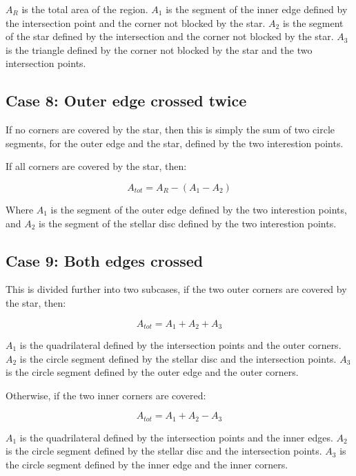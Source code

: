 \documentclass[a4paper,fleqn,usenatbib]{mnras}
\begin{document}
$A_R$ is the total area of the region. $A_1$ is the segment of the inner edge defined by the intersection point and the corner not blocked by the star. $A_2$ is the segment of the star defined by the intersection and the corner not blocked by the star. $A_3$ is the triangle defined by the corner not blocked by the star and the two intersection points.

\subsection*{Case 8: Outer edge crossed twice}

If no corners are covered by the star, then this is simply the sum of two circle segments, for the outer edge and the star, defined by the two interestion points.

If all corners are covered by the star, then:

\begin{equation} \label{eq:inner_outer}
A_{tot} = A_R - (A_1 - A_2)
\end{equation}

Where $A_1$ is the segment of the outer edge defined by the two interestion points, and $A_2$ is the segment of the stellar disc defined by the two interestion points. 

\subsection*{Case 9: Both edges crossed}

This is divided further into two subcases, if the two outer corners are covered by the star, then:

\begin{equation} \label{eq:inner_outer}
A_{tot} = A_1 + A_2 + A_3
\end{equation}

$A_1$ is the quadrilateral defined by the intersection points and the outer corners. $A_2$ is the circle segment defined by the stellar disc and the intersection points. $A_3$ is the circle segment defined by the outer edge and the outer corners.

Otherwise, if the two inner corners are covered:

\begin{equation} \label{eq:inner_outer}
A_{tot} = A_1 + A_2 - A_3
\end{equation}

$A_1$ is the quadrilateral defined by the intersection points and the inner edges. $A_2$ is the circle segment defined by the stellar disc and the intersection points. $A_3$ is the circle segment defined by the inner edge and the inner corners.
\end{document}

